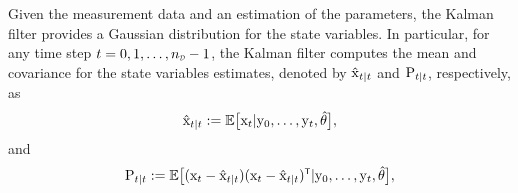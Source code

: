 %
%
% 
%
%
Given the measurement data and an estimation of the parameters, the Kalman filter provides a Gaussian distribution for the state variables. In particular, for any time step $t = 0, 1, \ldots, \nD-1$, the Kalman filter computes the mean and covariance for the state variables estimates, denoted by $\hat{{ \mathrm{x} }}_{t|t}$ and ${ \mathrm{P} }_{t|t}$, respectively, as 
\begin{equation}
    \hat{{ \mathrm{x} }}_{t|t} := \mathbb{E}\big[{ \mathrm{x} }_t | { \mathrm{y} }_0, \ldots, { \mathrm{y} }_t, \hat{{ \mathrm{\theta} }}\big], 
\end{equation}
and
\begin{equation}
    \mxP_{t|t} := \mathbb{E}\big[(\vcx_t - \hat{\vcx}_{t|t})(\vcx_t - \hat{\vcx}_{t|t})^\tr | \vcy_0, \ldots, \vcy_t, \hat{\vctheta}\big],
\end{equation}
